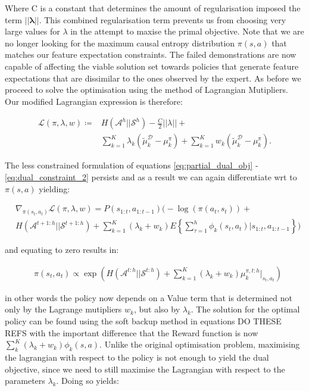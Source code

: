 \documentclass[letterpaper]{article}
\begin{document}
Where C is a constant that determines the amount of regularisation imposed the term $||\mathbf{\lambda}||$. This combined regularisation term prevents us from choosing very large values for $\lambda$ in the attempt to maxise the primal objective. Note that we are no longer looking for the maximum causal entropy distribution $\pi(s,a)$ that matches our feature expectation constraints. The failed demonstrations are now capable of affecting the viable solution set towards policies that generate feature expectations that are dissimilar to the ones observed by the expert. As before we proceed to solve the optimisation using the method of Lagrangian Mutipliers. Our modified Lagrangian expression is therefore:

\begin{align}
\label{eq:partial_lagrangian_failure}
\mathcal{L}(\pi,\lambda,w)\coloneqq & H(\mathcal{A}^h||\mathcal{S}^h) - \frac{C}{2}||\lambda|| + \\
&\sum_{k=1}^K\lambda_k (\widetilde{\mu}^{\mathcal{D}}_k-\mu^{\pi}_k) + \sum_{k=1}^Kw_k(\widetilde{\mu}^{\mathcal{D}}_k-\mu^{\pi}_k).
\end{align}

The less constrained formulation of equations \eqref{eq:partial_dual_obj} - \eqref{eq:dual_constraint_2} persists and as a result we can
again differentiate wrt to $\pi(s,a)$ yielding:

\begin{equation}
 \begin{split}
 &\nabla_{\pi(s_t,a_t)}\mathcal{L}(\pi,\lambda,w) = P(s_{1:t},a_{1:t-1})\Bigg(-\log(\pi(a_t,s_t))+ \\
& H(\mathcal{A}^{t+1:h}||\mathcal{S}^{t+1:h})
 +\sum_{k=1}^K (\lambda_k + w_k)E\left\{\sum_{\tau=1}^h \phi_k(s_t,a_t)|s_{1:t},a_{1:t-1}\right\}\Bigg) \label{eqn:lagragian_derivative_failure}
 \end{split}
\end{equation}

and equating to zero results in:

\begin{equation}
	\begin{split}
	&\pi(s_t,a_t) \propto \exp\left(H(\mathcal{A}^{t:h}||\mathcal{S}^{t:h})+\sum^K_{k=1}(\lambda_k + w_k)\mu_k^{\pi,t:h}|_{s_t,a_t}\right)
	\end{split}
\end{equation}



in other words the policy now depends on a Value term that is determined not only by the Lagrange mutipliers $w_k$, but also by $\lambda_k$.
The solution for the optimal policy can be found using the soft backup method in equations DO THESE REFS
with the important difference that the Reward function is now $\sum_k^K(\lambda_k + w_k)\phi_k(s,a)$. Unlike the original optimisation problem,
maximising the lagrangian with respect to the policy is not enough to yield the dual objective, since we need to still maximise the Lagrangian with respect to the parameters $\lambda_k$. Doing so yields:
\end{document}
